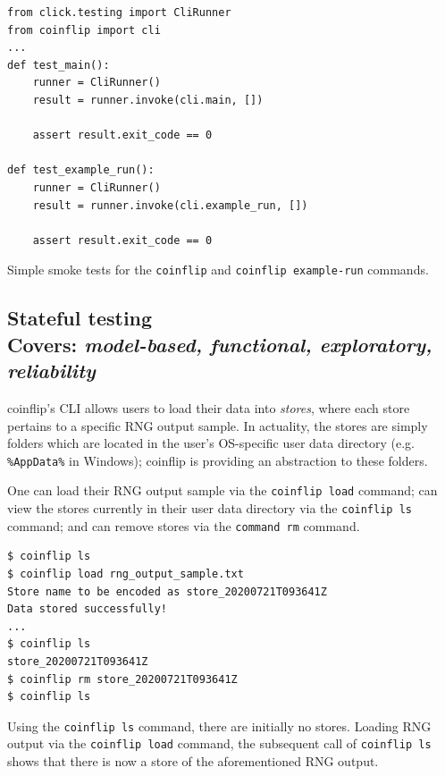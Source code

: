 \documentclass[11pt]{article}
\begin{document}
\begin{listing}[htbp]
\begin{verbatim}
from click.testing import CliRunner
from coinflip import cli
...
def test_main():
    runner = CliRunner()
    result = runner.invoke(cli.main, [])

    assert result.exit_code == 0

def test_example_run():
    runner = CliRunner()
    result = runner.invoke(cli.example_run, [])

    assert result.exit_code == 0
\end{verbatim}
\caption[Smoke testing the coinflip CLI]{Simple smoke tests for the \texttt{coinflip} and \texttt{coinflip example-run} commands.}
\end{listing}

\subsection[Stateful testing]{Stateful testing\\ \small{Covers: \emph{model-based, functional, exploratory, reliability}}}
\label{sec:model}

coinflip's CLI allows users to load their data into \textit{stores}, where each store pertains to a specific RNG output sample. In actuality, the stores are simply folders which are located in the user's OS-specific user data directory (e.g. \texttt{\%AppData\%} in Windows); coinflip is providing an abstraction to these folders.

One can load their RNG output sample via the \texttt{coinflip load} command; can view the stores currently in their user data directory via the \texttt{coinflip ls} command; and can remove stores via the \texttt{command rm} command.

\begin{listing}[htbp]
  \begin{verbatim}
$ coinflip ls
$ coinflip load rng_output_sample.txt
Store name to be encoded as store_20200721T093641Z
Data stored successfully!
...
$ coinflip ls
store_20200721T093641Z
$ coinflip rm store_20200721T093641Z
$ coinflip ls
  \end{verbatim}
  \caption[\texttt{conflip ls} command before and after \texttt{conflip load}]{Using the \texttt{coinflip ls} command, there are initially no stores. Loading RNG output via the \texttt{coinflip load} command, the subsequent call of \texttt{coinflip ls} shows that there is now a store of the aforementioned RNG output.}
\end{listing}
\end{document}

